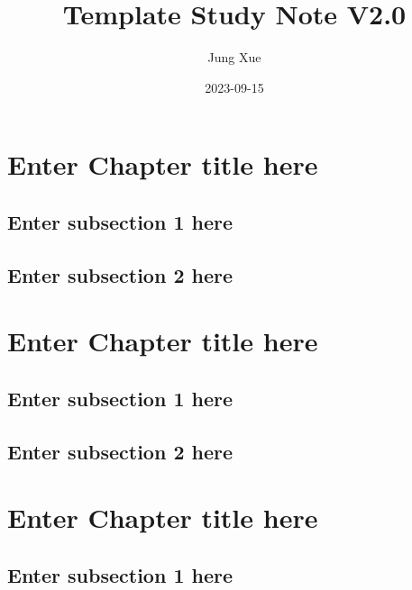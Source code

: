 \documentclass[
]{book}
\title{Template Study Note V2.0}
\author{Jung Xue}
\date{2023-09-15}
\begin{document}
\maketitle

{
\setcounter{tocdepth}{1}
\tableofcontents
}
\hypertarget{ch1}{%
\chapter{Enter Chapter title here}\label{ch1}}

\hypertarget{enter-subsection-1-here}{%
\section{Enter subsection 1 here}\label{enter-subsection-1-here}}

\hypertarget{enter-subsection-2-here}{%
\section{Enter subsection 2 here}\label{enter-subsection-2-here}}

\hypertarget{ch2}{%
\chapter{Enter Chapter title here}\label{ch2}}

\hypertarget{enter-subsection-1-here-1}{%
\section{Enter subsection 1 here}\label{enter-subsection-1-here-1}}

\hypertarget{enter-subsection-2-here-1}{%
\section{Enter subsection 2 here}\label{enter-subsection-2-here-1}}

\hypertarget{ch3}{%
\chapter{Enter Chapter title here}\label{ch3}}

\hypertarget{enter-subsection-1-here-2}{%
\section{Enter subsection 1 here}\label{enter-subsection-1-here-2}}
\end{document}
